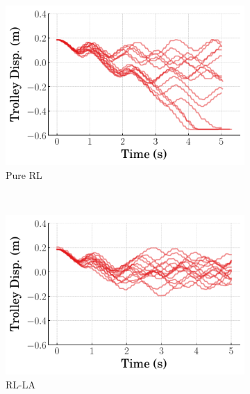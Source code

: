 %
%
\begin{figure}[h!]
    \centering
    \begin{subfigure}[b]{0.49\textwidth}
        \centering
        \includegraphics[width=\textwidth]{figures/figures_RL_model_based_control/time_responses_crane_experiments/pure_RL_trolley_experiment.pdf}
        \caption{Pure RL}
        \label{subfig_chap2:dpcrane_experiment_trolley_pure_RL}
    \end{subfigure}\\
    \hfill
    \begin{subfigure}[b]{0.49\textwidth}
	    \centering
	    \includegraphics[width=\textwidth]{figures/figures_RL_model_based_control/time_responses_crane_experiments/RL-LA_trolley_experiment.pdf}
	    \caption{RL-LA}
	    \label{subfig_chap2:dpcrane_experiment_trolley_RL_LA}
    \end{subfigure}
    \hfill
    \begin{subfigure}[b]{0.49\textwidth}

\end{subfigure}
\end{figure}
